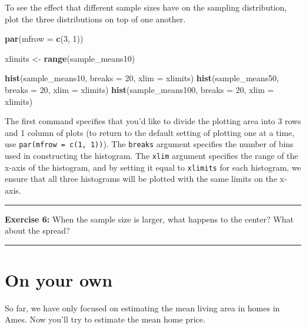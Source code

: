 \documentclass[]{book}
\newenvironment{Shaded}{\begin{snugshade}}{\end{snugshade}}
\newcommand{\KeywordTok}[1]{\textcolor[rgb]{0.13,0.29,0.53}{\textbf{#1}}}
\newcommand{\DataTypeTok}[1]{\textcolor[rgb]{0.13,0.29,0.53}{#1}}
\newcommand{\DecValTok}[1]{\textcolor[rgb]{0.00,0.00,0.81}{#1}}
\newcommand{\StringTok}[1]{\textcolor[rgb]{0.31,0.60,0.02}{#1}}
\newcommand{\NormalTok}[1]{#1}
\theoremstyle{definition}
\theoremstyle{definition}
\theoremstyle{definition}
\theoremstyle{remark}
\begin{document}
To see the effect that different sample sizes have on the sampling
distribution, plot the three distributions on top of one another.

\begin{Shaded}
\begin{Highlighting}[]
\KeywordTok{par}\NormalTok{(}\DataTypeTok{mfrow =} \KeywordTok{c}\NormalTok{(}\DecValTok{3}\NormalTok{, }\DecValTok{1}\NormalTok{))}

\NormalTok{xlimits <-}\StringTok{ }\KeywordTok{range}\NormalTok{(sample_means10)}

\KeywordTok{hist}\NormalTok{(sample_means10, }\DataTypeTok{breaks =} \DecValTok{20}\NormalTok{, }\DataTypeTok{xlim =}\NormalTok{ xlimits)}
\KeywordTok{hist}\NormalTok{(sample_means50, }\DataTypeTok{breaks =} \DecValTok{20}\NormalTok{, }\DataTypeTok{xlim =}\NormalTok{ xlimits)}
\KeywordTok{hist}\NormalTok{(sample_means100, }\DataTypeTok{breaks =} \DecValTok{20}\NormalTok{, }\DataTypeTok{xlim =}\NormalTok{ xlimits)}
\end{Highlighting}
\end{Shaded}

The first command specifies that you'd like to divide the plotting area
into 3 rows and 1 column of plots (to return to the default setting of
plotting one at a time, use \texttt{par(mfrow\ =\ c(1,\ 1))}). The
\texttt{breaks} argument specifies the number of bins used in
constructing the histogram. The \texttt{xlim} argument specifies the
range of the x-axis of the histogram, and by setting it equal to
\texttt{xlimits} for each histogram, we ensure that all three histograms
will be plotted with the same limits on the x-axis.

\begin{center}\rule{0.5\linewidth}{\linethickness}\end{center}

\textbf{Exercise 6:} When the sample size is larger, what happens to the
center? What about the spread?

\begin{center}\rule{0.5\linewidth}{\linethickness}\end{center}

\section{On your own}\label{on-your-own-3}

So far, we have only focused on estimating the mean living area in homes
in Ames. Now you'll try to estimate the mean home price.
\end{document}
